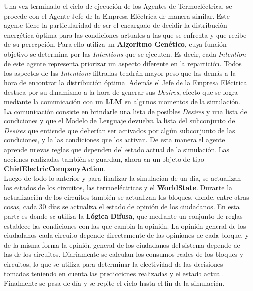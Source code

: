 \documentclass[twocolumn, fontsize=10pt]{article}
\begin{document}
Una vez terminado el ciclo de ejecución de los Agentes de Termoeléctrica, se procede con el Agente Jefe de la Empresa Eléctrica de manera similar. Este agente tiene la particularidad de ser el 
encargado de decidir la distribución energética óptima para las condiciones actuales a las que se enfrenta y que recibe de su percepción. Para ello utiliza un \textbf{Algoritmo Genético}, cuya función objetivo se determina por las \textit{Intentions}
que se ejecuten. Es decir, cada \textit{Intention} de este agente representa priorizar un aspecto diferente en la repartición. Todos los aspectos de las \textit{Intentions} filtradas tendrán mayor peso que las demás a la hora de encontrar la distribución óptima.
Además el Jefe de la Empresa Eléctrica destaca por su dinamismo a la hora de generar sus \textit{Desires}, efecto que se logra mediante la comunicación con un \textbf{LLM} en algunos momentos de la simulación. La comunicación consiste en brindarle una lista de posibles
\textit{Desires} y una lista de condiciones y que el Modelo de Lenguaje devuelva la lista del subconjunto de \textit{Desires} que entiende que deberían ser activados por algún subconjunto de las condiciones, y la las condiciones que los activan. De esta manera el agente aprende nuevas 
reglas que dependen del estado actual de la simulación. Las acciones realizadas también se guardan, ahora en un objeto de tipo \textbf{ChiefElectricCompanyAction}.\\

Luego de todo lo anterior y para finalizar la simulación de un día, se actualizan los estados de los circuitos, las termoeléctricas y el \textbf{WorldState}. Durante la actualización de los circuitos
también se actualizan los bloques, donde, entre otras cosas, cada 30 días se actualiza el estado de opinión de los ciudadanos. En esta parte es donde se utiliza la \textbf{Lógica Difusa}, que mediante un conjunto de reglas establece las condiciones con las que cambia la opinión. La opinión general de los ciudadanos cada
circuito depende directamente de las opiniones de cada bloque, y de la misma forma la opinión general de los ciudadanos del sistema depende de las de los circuitos. Diariamente se calculan los consumos reales de los bloques y circuitos, lo que se utiliza para determinar la efectividad de las decisiones tomadas teniendo en cuenta las predicciones realizadas
y el estado actual.\\

Finalmente se pasa de día y se repite el ciclo hasta el fin de la simulación.
\end{document}
